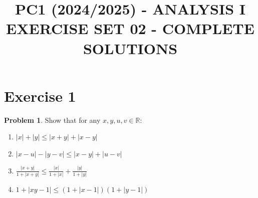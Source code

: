 \documentclass{article}
\title{PC1 (2024/2025) - ANALYSIS I \\ EXERCISE SET 02 - COMPLETE SOLUTIONS}
\date{}
\theoremstyle{definition}
\newtheorem{problem}{Problem}
\begin{document}
\maketitle

\section*{Exercise 1}

\begin{problem}
Show that for any \( x, y, u, v \in \mathbb{R} \):
\begin{enumerate}[label=(\roman*)]
    \item \( |x| + |y| \leq |x + y| + |x - y| \)
    \item \( |x - u| - |y - v| \leq |x - y| + |u - v| \)
    \item \( \frac{|x + y|}{1 + |x + y|} \leq \frac{|x|}{1 + |x|} + \frac{|y|}{1 + |y|} \)
    \item \( 1 + |xy - 1| \leq (1 + |x - 1|)(1 + |y - 1|) \)
\end{enumerate}
\end{problem}
\end{document}
